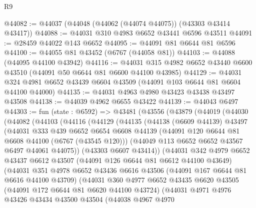 \begin{lexlean}{R9}
\begin{coremodule}
@44082 := @44037 (@44048 (@44062 (@44074 @44075)) (@43303 @43414 @43417))
@44088 := @44031 @310 @4983 @6652 @43441 @6596 @43511
@44091 := @28459 @44022 @143 @6652
@44095 := @44091 @81 @6644 @81 @6596
@44100 := @44055 @81 @43452 (@6767 (@44058 @81))
@44103 := @44088 (@44095 @44100 @43942)
@44116 := @44031 @315 @4982 @6652 @43440 @6600 @43510 (@44091 @50 @6644 @81 @6600 @44100 @43985)
@44129 := @44031 @324 @4981 @6652 @43439 @6604 @43509 (@44091 @103 @6644 @81 @6604 @44100 @44000)
@44135 := @44031 @4963 @4980 @43423 @43438 @43497 @43508
@44138 := @44039 @4962 @6655 @43422
@44139 := @44043 @6497
@44303 := fun (state : @6592) =>
  @43481
    (@43556
      (@43879
        (@44019
          (@44030
            (@44082
              (@44103
                (@44116
                  (@44129
                    (@44135
                      (@44138
                        (@6609 @44139)
                        @43497
                        (@44031
                          @333
                          @439
                          @6652
                          @6654
                          @6608
                          @44139
                          (@44091 @120 @6644 @81 @6608 @44100 (@6767 (@43545 @120)))
                          (@44049 @113 @6652 @6652 @43567 @6497 @44061 @44075))
                        (@43303 @6607 @43414))
                      (@44031
                        @342
                        @4979
                        @6652
                        @43437
                        @6612
                        @43507
                        (@44091 @126 @6644 @81 @6612 @44100 @43649)
                        (@44031
                          @351
                          @4978
                          @6652
                          @43436
                          @6616
                          @43506
                          (@44091 @167 @6644 @81 @6616 @44100 @43709)
                          (@44031
                            @360
                            @4977
                            @6652
                            @43435
                            @6620
                            @43505
                            (@44091 @172 @6644 @81 @6620 @44100 @43724)
                            (@44031
                              @4971
                              @4976
                              @43426
                              @43434
                              @43500
                              @43504
                              (@44038
                                @4967
                                @4970

\end{coremodule}
\end{lexlean}
